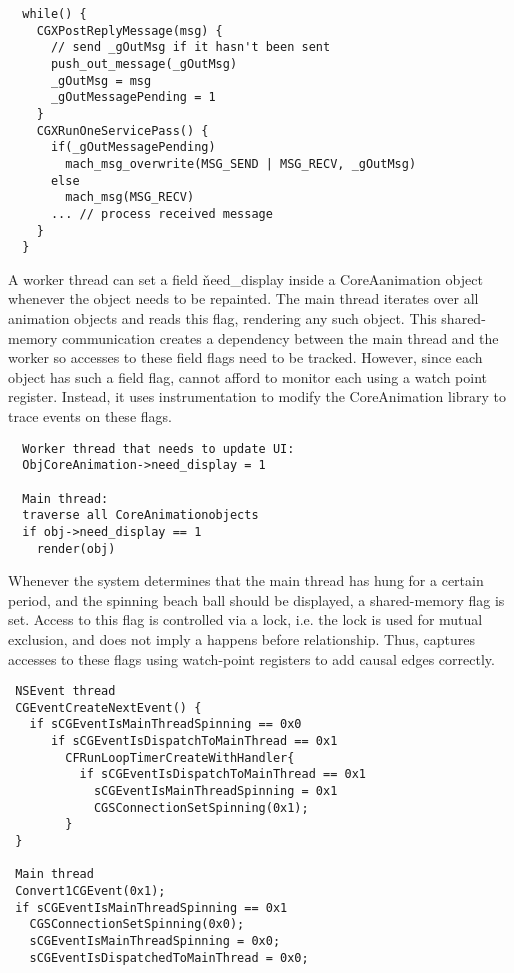 {\footnotesize \begin{verbatim}
  while() {
    CGXPostReplyMessage(msg) {
      // send _gOutMsg if it hasn't been sent
      push_out_message(_gOutMsg)
      _gOutMsg = msg
      _gOutMessagePending = 1
    }
    CGXRunOneServicePass() {
      if(_gOutMessagePending)
        mach_msg_overwrite(MSG_SEND | MSG_RECV, _gOutMsg)
      else
        mach_msg(MSG_RECV)
      ... // process received message
    }
  }
\end{verbatim}
}

A worker thread can set a field \v{need\_display} inside a CoreAanimation object
whenever the object needs to be repainted. The main thread iterates over all
animation objects and reads this flag, rendering any such object. This shared-memory communication creates
a dependency between the main thread and the worker so accesses to these
field flags need to be tracked.  However, since each object has such a
field flag, \xxx cannot afford to monitor each using a watch point
register.  Instead, it uses instrumentation to modify the CoreAnimation
library to trace events on these flags.


{\footnotesize \begin{verbatim}
  Worker thread that needs to update UI:
  ObjCoreAnimation->need_display = 1

  Main thread:
  traverse all CoreAnimationobjects
  if obj->need_display == 1
    render(obj)
\end{verbatim}
}

Whenever the system determines that the main thread has hung for a certain
period, and the spinning beach ball should be displayed, a shared-memory flag
is set. Access to this flag is controlled via a lock, i.e. the lock is used for
mutual exclusion, and does not imply a happens before relationship.  Thus,
\xxx captures accesses to these flags using watch-point registers to add
causal edges correctly.

{\footnotesize \begin{verbatim}
 NSEvent thread                     
 CGEventCreateNextEvent() {
   if sCGEventIsMainThreadSpinning == 0x0
      if sCGEventIsDispatchToMainThread == 0x1
        CFRunLoopTimerCreateWithHandler{
          if sCGEventIsDispatchToMainThread == 0x1
            sCGEventIsMainThreadSpinning = 0x1
            CGSConnectionSetSpinning(0x1);
        }
 }

 Main thread
 Convert1CGEvent(0x1);
 if sCGEventIsMainThreadSpinning == 0x1
   CGSConnectionSetSpinning(0x0);
   sCGEventIsMainThreadSpinning = 0x0;
   sCGEventIsDispatchedToMainThread = 0x0;

\end{verbatim}
}

